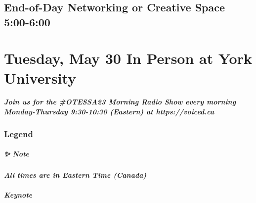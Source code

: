\documentclass[
]{book}
\begin{document}
\hypertarget{end-of-day-networking-or-creative-space-500-600}{%
\section*{End-of-Day Networking or Creative Space \textbar{} 5:00-6:00}\label{end-of-day-networking-or-creative-space-500-600}}

\hypertarget{tuesday-may-30-in-person-at-york-university}{%
\chapter{Tuesday, May 30 \textbar{} In Person at York University}\label{tuesday-may-30-in-person-at-york-university}}

\begin{protip}
\hypertarget{join-us-for-the-otessa23-morning-radio-show-every-morning-monday-thursday-930-1030-eastern-at-httpsvoiced.ca}{%
\paragraph{Join us for the \#OTESSA23 Morning Radio Show every morning
Monday-Thursday 9:30-10:30 (Eastern) at
https://voiced.ca}\label{join-us-for-the-otessa23-morning-radio-show-every-morning-monday-thursday-930-1030-eastern-at-httpsvoiced.ca}}
\end{protip}

\hypertarget{legend-2}{%
\subsection*{Legend}\label{legend-2}}

\begin{protip}
\hypertarget{note}{%
\paragraph*{✨ Note}\label{note}}

\textbf{\emph{All times are in Eastern Time (Canada)}}
\end{protip}

\begin{keynote}
\hypertarget{keynote}{%
\paragraph{Keynote}\label{keynote}}
\end{keynote}
\end{document}
